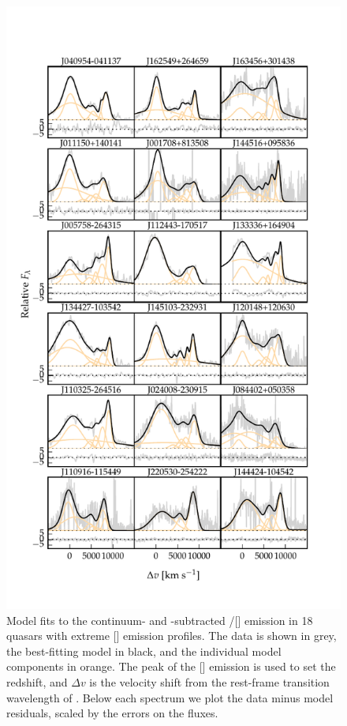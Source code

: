 \begin{figure}
    \centering
    \includegraphics[width=\columnwidth]{figures/chapter04/example_spectrum_grid_extreme_oiii.pdf} 
    \caption[{Model fits to the continuum- and -subtracted \hbns/[] emission in 18 quasars with extreme [] emission profiles.}]{Model fits to the continuum- and -subtracted \hbns/[] emission in 18 quasars with extreme [] emission profiles. The data is shown in grey, the best-fitting model in black, and the individual model components in orange. The peak of the [] emission is used to set the redshift, and $\Delta{v}$ is the velocity shift from the rest-frame transition wavelength of \hb. Below each spectrum we plot the data minus model residuals, scaled by the errors on the fluxes.}     
    \label{fig:example_spectrum_grid_extreme_oiii}
\end{figure}

